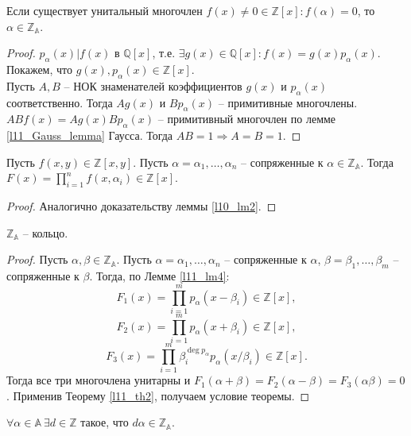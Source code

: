 \begin{theorem} \label{l11_th2}
	Если существует унитальный многочлен $f(x) \ne 0 \in \mathbb{Z}[x]: f(\alpha) = 0$, то $\alpha \in \mathbb{Z_{\mathbb{A}}}$.
\end{theorem}
\begin{proof}
	$p_{\alpha}(x) | f(x)$ в $\mathbb{Q}[x]$, т.е. $\exists g(x) \in \mathbb{Q}[x]: f(x) = g(x) p_{\alpha}(x)$.\\
	Покажем, что  $g(x), p_{\alpha}(x) \in \mathbb{Z}[x]$.\\
	Пусть $A, B$ -- НОК знаменателей коэффициентов $g(x)$ и $p_{\alpha}(x)$ соответственно. Тогда $Ag(x)$ и $Bp_{\alpha}(x)$ -- примитивные многочлены.\\
	$ABf(x) = Ag(x) Bp_{\alpha}(x)$ -- примитивный многочлен по лемме \ref{l11_Gauss_lemma} Гаусса. Тогда $AB = 1 \Rightarrow A = B = 1$.
\end{proof}

\begin{lemma} \label{l11_lm4}
	Пусть $f(x, y) \in \mathbb{Z}[x, y]$. Пусть $\alpha = \alpha_1, \ldots, \alpha_n$ -- сопряженные к $\alpha \in \mathbb{Z_{\mathbb{A}}}$. 
	Тогда $\displaystyle F(x) = \prod_{i = 1}^{n} f(x, \alpha_i) \in \mathbb{Z}[x]$.
\end{lemma}
\begin{proof}
	Аналогично доказательству леммы \ref{l10_lm2}.
\end{proof}

\begin{theorem} \label{l11_th3}
	$\mathbb{Z_{\mathbb{A}}}$ -- кольцо.
\end{theorem}
\begin{proof}
	Пусть $\alpha, \beta \in \mathbb{Z_{\mathbb{A}}}$. Пусть $\alpha = \alpha_1, \ldots, \alpha_n$  -- сопряженные к $\alpha$, $\beta = \beta_1, \ldots, \beta_m$ -- сопряженные к $\beta$.
	Тогда, по Лемме \ref{l11_lm4}:
	$$F_1(x) = \prod_{i = 1}^{m} p_{\alpha}(x - \beta_i) \in \mathbb{Z}[x],$$
	$$F_2(x) = \prod_{i = 1}^{m} p_{\alpha}(x + \beta_i) \in \mathbb{Z}[x],$$
	$$F_3(x) = \prod_{i = 1}^{m} \beta_i^{\deg p_{\alpha}} p_{\alpha}(x / \beta_i) \in \mathbb{Z}[x].$$
	Тогда все три многочлена унитарны и $F_1(\alpha + \beta) = F_2(\alpha - \beta) = F_3(\alpha \beta) = 0$. Применив Теорему \ref{l11_th2}, получаем условие теоремы.
\end{proof}

\begin{problem}
	$\forall \alpha \in \mathbb{A} \ \exists d \in \mathbb{Z}$ такое, что $d \alpha \in \mathbb{Z_{\mathbb{A}}}$.
\end{problem}~\\

